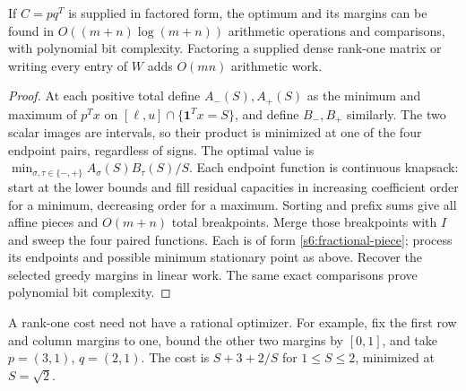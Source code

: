 \begin{proposition}\label{s6:rank-one-cost}
If $C=pq^T$ is supplied in factored form, the optimum and its margins
can be found in $O((m+n)\log(m+n))$ arithmetic operations and comparisons,
with polynomial bit complexity. Factoring a supplied dense rank-one
matrix or writing every entry of $W$ adds $O(mn)$ arithmetic work.
\end{proposition}
\begin{proof}
At each positive total define $A_-(S),A_+(S)$ as the minimum and maximum
of $p^Tx$ on $[\ell,u]\cap\{\mathbf1^Tx=S\}$, and define $B_-,B_+$
similarly. The two scalar images are intervals, so their product is
minimized at one of the four endpoint pairs, regardless of signs.
The optimal value is
$\min_{\sigma,\tau\in\{-,+\}}A_\sigma(S)B_\tau(S)/S$.
Each endpoint function is continuous knapsack: start at the lower bounds
and fill residual capacities in increasing coefficient order for a
minimum, decreasing order for a maximum. Sorting and prefix sums give
all affine pieces and $O(m+n)$ total breakpoints. Merge those breakpoints
with $I$ and sweep the four paired functions. Each is of form
\eqref{s6:fractional-piece}; process its endpoints and possible minimum
stationary point as above. Recover the selected greedy margins in linear
work. The same exact comparisons prove polynomial bit complexity.
\end{proof}
A rank-one cost need not have a rational optimizer. For example, fix
the first row and column margins to one, bound the
other two margins by $[0,1]$, and take $p=(3,1)$, $q=(2,1)$.
The cost is $S+3+2/S$ for $1\le S\le2$, minimized at $S=\sqrt2$.

